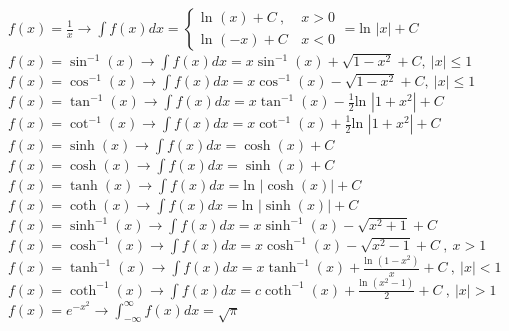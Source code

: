 \documentclass[12pt]{article}
\def\ln{\text{ln\ }} %
\begin{document}
\begin{flushleft}
	\textbullet \quad $\displaystyle f(x) =\frac{1}{x} \rightarrow \int f(x) dx = \begin{cases} \ln (x) + C\ , & x> 0 \\ 
																													  \ln (-x) + C\, & x < 0  \end{cases}
									 = \ln|x| + C$ \linebreak 
	\textbullet \quad $\displaystyle f(x) = \sin ^{-1} (x) \rightarrow \int f(x) dx = x \sin ^{-1} (x) + \sqrt{1-x^2} + C, \ |x| \leq 1 $ \linebreak 
	\textbullet \quad $\displaystyle f(x) = \cos ^{-1} (x) \rightarrow \int f(x) dx = x\cos ^{-1} (x) - \sqrt{1-x^2} + C, \ |x| \leq 1 $ \linebreak 
	\textbullet \quad $\displaystyle f(x) = \tan^{-1} (x) \rightarrow \int f(x) dx = x \tan^{-1} (x) -\frac{1}{2} \ln|1+x^2| + C $ \linebreak 
	\textbullet \quad $\displaystyle f(x) = \cot ^{-1} (x) \rightarrow \int f(x) dx = x \cot ^{-1} (x) + \frac{1}{2} \ln|1+x^2| + C $ \linebreak 
	\textbullet \quad $\displaystyle f(x) = \sinh (x) \rightarrow \int f(x) dx = \cosh (x) + C $ \linebreak 
	\textbullet \quad $\displaystyle f(x) = \cosh (x) \rightarrow \int f(x) dx = \sinh (x) + C $ \linebreak 
	\textbullet \quad $\displaystyle f(x) = \tanh (x) \rightarrow \int f(x) dx = \ln|\cosh (x)| + C$ \linebreak 
	\textbullet \quad $\displaystyle f(x) = \coth(x) \rightarrow \int f(x) dx = \ln|\sinh (x) | + C $ \linebreak 
	\textbullet \quad $\displaystyle f(x) = \sinh ^{-1} (x) \rightarrow \int f(x) dx = x \sinh ^{-1} (x) - \sqrt{x^2 + 1} + C $ \linebreak 
	\textbullet \quad $\displaystyle f(x) = \cosh ^{-1} (x) \rightarrow \int f(x) dx = x \cosh ^{-1} (x) - \sqrt{x^2 - 1} + C \ , \ x > 1$ \linebreak 
	\textbullet \quad $\displaystyle f(x) = \tanh ^{-1} (x) \rightarrow \int f(x) dx = x \tanh ^{-1} (x) + \frac{\ln(1-x^2)}{x} + C\ , \ |x| < 1 $ \linebreak 
	\textbullet \quad $\displaystyle f(x) = \coth ^{-1} (x) \rightarrow \int f(x) dx = c \coth ^{-1}(x) + \frac{\ln(x^2 -1)}{2} + C \ , \ |x| > 1 $ \linebreak 
	\textbullet \quad $\displaystyle f(x) = e^{-x^2} \rightarrow \int_{-\infty}^{\infty} f(x) dx = \sqrt{\pi}$ \linebreak 

\end{flushleft}
\end{document}
